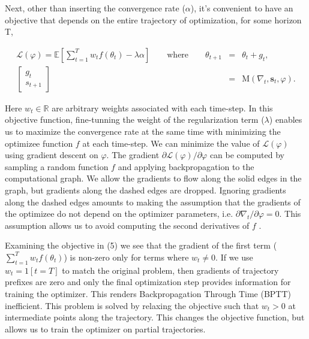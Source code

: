\documentclass[a4paper, 11pt]{article}
\begin{document}
Next, other than inserting the convergence rate ($\alpha$), it's convenient to have an objective that depends on the entire trajectory of optimization, for some horizon T,

\begin{eqnarray}
\mathcal{L}(\varphi)=\mathbb{E}\left[\sum_{t=1}^{T}w_tf(\theta_t)-\lambda\alpha\right]\qquad \text{where}\qquad \theta_{t+1}&=&\theta_t+g_t,\\
\left[ \begin{matrix} g_t\\ s_{t+1} \end{matrix} \right]&=&\text{M}(\nabla_t,\textbf{s$_t$},\varphi).
\end{eqnarray}

Here $w_t\in\mathbb{R}$ are arbitrary weights associated with each time-step. In this objective function, fine-tunning the weight of the regularization term ($\lambda$) enables us to maximize the convergence rate at the same time with minimizing the optimizee function $f$ at each time-step. We can minimize the value of $\mathcal{L}(\varphi)$ using gradient descent on $\varphi$. The gradient $\partial\mathcal{L}(\varphi)/\partial\varphi$ can be computed by sampling a random function $f$ and applying backpropagation to the computational graph. We allow the gradients to flow along the solid edges in the graph, but gradients along the dashed edges are dropped. Ignoring gradients along the dashed edges amounts to making the assumption that the gradients of the optimizee do not depend on the optimizer parameters, i.e. $\partial\nabla_t/\partial\varphi=0$. This assumption allows us to avoid computing the second derivatives of $f$ \cite{andrychowicz2016learning}.

Examining the objective in (5) we see that the gradient of the first term ($\sum_{t=1}^{T}w_tf(\theta_t)$) is non-zero only for terms where $w_t\neq0$. If we use $w_t=1[t=T]$ to match the original problem, then gradients of trajectory prefixes are zero and only the final optimization step provides information for training the optimizer. This renders Backpropagation Through Time (BPTT) inefficient. This problem is solved by relaxing the objective such that $w_t>0$ at intermediate points along the trajectory. This changes the objective function, but allows us to train the optimizer on partial trajectories.
\end{document}
